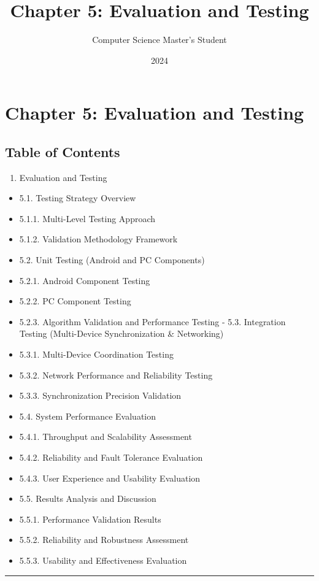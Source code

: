 \documentclass[12pt,a4paper]{article}
\title{Chapter 5: Evaluation and Testing}
\author{Computer Science Master's Student}
\date{2024}
\begin{document}
\maketitle

\section{Chapter 5: Evaluation and Testing}

\subsection{Table of Contents}

\begin{enumerate}
\item Evaluation and Testing
\end{enumerate}
\begin{itemize}
\item 5.1. Testing Strategy Overview
\item 5.1.1. Multi-Level Testing Approach
\item 5.1.2. Validation Methodology Framework
\item 5.2. Unit Testing (Android and PC Components)
\item 5.2.1. Android Component Testing
\item 5.2.2. PC Component Testing
\item 5.2.3. Algorithm Validation and Performance Testing
    -
    5.3. Integration Testing (Multi-Device Synchronization \& Networking)
\item 5.3.1. Multi-Device Coordination Testing
\item 5.3.2. Network Performance and Reliability Testing
\item 5.3.3. Synchronization Precision Validation
\item 5.4. System Performance Evaluation
\item 5.4.1. Throughput and Scalability Assessment
\item 5.4.2. Reliability and Fault Tolerance Evaluation
\item 5.4.3. User Experience and Usability Evaluation
\item 5.5. Results Analysis and Discussion
\item 5.5.1. Performance Validation Results
\item 5.5.2. Reliability and Robustness Assessment
\item 5.5.3. Usability and Effectiveness Evaluation

\end{itemize}
\hrule
\end{document}
